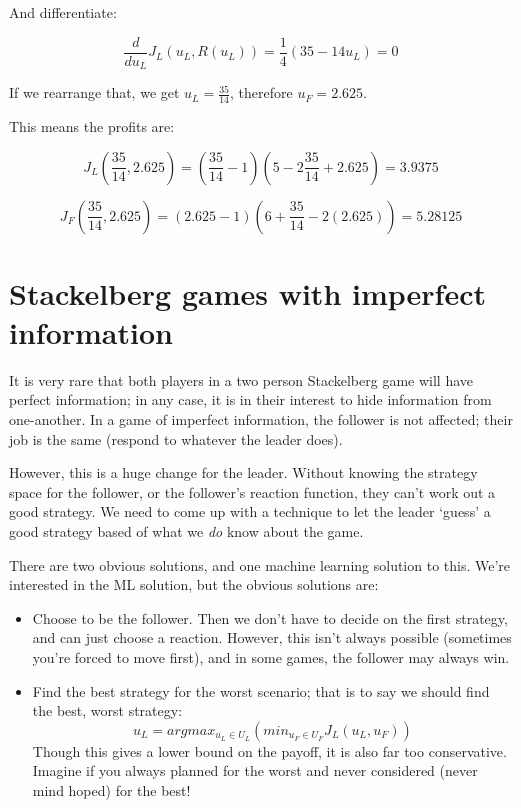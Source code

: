 And differentiate:

\[
  \frac{d}{du_L}J_L(u_L, R(u_L)) = \frac{1}{4}(35 - 14u_L) = 0
\]

If we rearrange that, we get $u_L = \frac{35}{14}$, therefore $u_F = 2.625$.

This means the profits are:

\[
  J_L(\frac{35}{14}, 2.625) = (\frac{35}{14} - 1)(5 - 2\frac{35}{14} + 2.625) = 3.9375
\]

\[
  J_F(\frac{35}{14}, 2.625) = (2.625 - 1)(6 + \frac{35}{14} - 2(2.625)) = 5.28125
\]


\section{Stackelberg games with imperfect information}

It is very rare that both players in a two person Stackelberg game will have
perfect information; in any case, it is in their interest to hide information
from one-another. In a game of imperfect information, the follower is not
affected; their job is the same (respond to whatever the leader does).

However, this is a huge change for the leader. Without knowing the strategy
space for the follower, or the follower's reaction function, they can't work out
a good strategy. We need to come up with a technique to let the leader `guess' a
good strategy based of what we \textit{do} know about the game.

There are two obvious solutions, and one machine learning solution to this.
We're interested in the ML solution, but the obvious solutions are:

\begin{itemize}
  \item Choose to be the follower. Then we don't have to decide on the first
  strategy, and can just choose a reaction. However, this isn't always possible
  (sometimes you're forced to move first), and in some games, the follower may
  always win.
  \item Find the best strategy for the worst scenario; that is to say we should
  find the best, worst strategy:
  \[
    u_L = arg max_{u_L \in U_L}(min_{u_F \in U_F}J_L(u_L, u_F))
  \]
  Though this gives a lower bound on the payoff, it is also far too
  conservative. Imagine if you always planned for the worst and never considered
  (never mind hoped) for the best!
\end{itemize}

